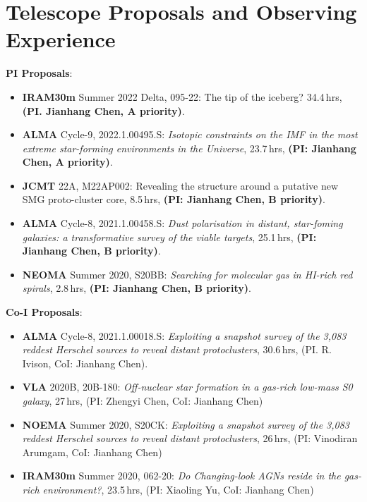 \documentclass[A4,11pt]{article}
\newenvironment{paperlist}
{ \begin{itemize}[leftmargin=0.8cm, label={$\bullet$}]
    \setlength{\itemsep}{1pt}
    \setlength{\parskip}{1pt}
    \setlength{\parsep}{1pt}     }
{ \end{itemize}                  }
\begin{document}

\section{Telescope Proposals and Observing Experience}
{\bf PI Proposals}:\\
\vspace{-0.8em}
\begin{paperlist}
    \item {\bf IRAM30m} Summer 2022 Delta, 095-22:  The tip of the iceberg? 34.4\,hrs, {\bf (PI. Jianhang Chen, A priority)}.
    \item {\bf ALMA} Cycle-9, 2022.1.00495.S: \emph{Isotopic constraints on the IMF in the most extreme star-forming environments in the Universe}, 23.7\,hrs, {\bf (PI: Jianhang Chen, A priority)}. 
    \item {\bf JCMT} 22A, M22AP002: Revealing the structure around a putative new SMG proto-cluster core, 8.5\,hrs, {\bf (PI: Jianhang Chen, B priority)}.
    \item {\bf ALMA} Cycle-8, 2021.1.00458.S: \emph{Dust polarisation in distant, star-foming galaxies: a transformative survey of the viable targets}, 25.1\,hrs, {\bf (PI: Jianhang Chen, B priority)}. 
    \item {\bf NEOMA} Summer 2020, S20BB: \emph{Searching for molecular gas in HI-rich red spirals}, 2.8\,hrs, {\bf (PI: Jianhang Chen, B priority)}. 
\end{paperlist}

{\bf Co-I Proposals}:\\
\vspace{-0.8em}
\begin{paperlist}
    \item {\bf ALMA} Cycle-8, 2021.1.00018.S: \emph{Exploiting a snapshot survey of the 3,083 reddest Herschel sources to reveal distant protoclusters}, 30.6\,hrs, (PI. R. Ivison, CoI: Jianhang Chen).
    \item {\bf VLA} 2020B, 20B-180: \emph{Off-nuclear star formation in a gas-rich low-mass S0 galaxy}, 27\,hrs, (PI: Zhengyi Chen, CoI: Jianhang Chen)
    \item {\bf NOEMA} Summer 2020, S20CK: \emph{Exploiting a snapshot survey of the 3,083 reddest Herschel sources to reveal distant protoclusters}, 26\,hrs, (PI: Vinodiran Arumgam, CoI: Jianhang Chen)
    \item {\bf IRAM30m} Summer 2020, 062-20: \emph{Do Changing-look AGNs reside in the gas-rich environment?}, 23.5\,hrs, (PI: Xiaoling Yu, CoI: Jianhang Chen)
\end{paperlist}
\end{document}
